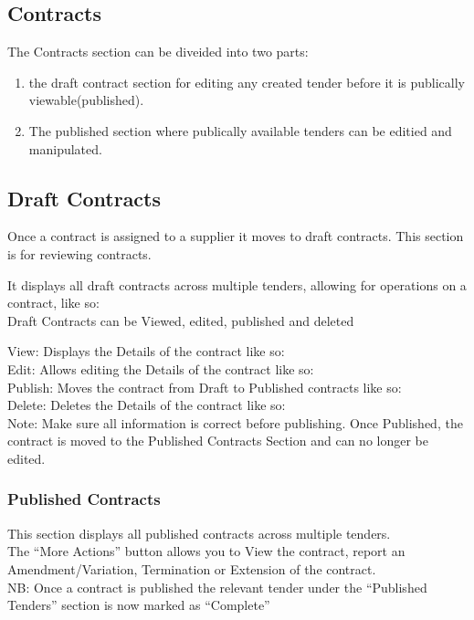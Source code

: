 \documentclass [12pt]{book}
\begin{document}
\begin{enumerate}
\begin{enumerate}
    


\subsection{Contracts}
The Contracts section can be  diveided into two parts: 
\begin{enumerate}
    \item the draft contract section for editing any created tender before it is publically viewable(published).
    \item The published section where publically available tenders can be editied and manipulated.
\end{enumerate}


\subsection{Draft Contracts}
Once a contract is assigned to a supplier it moves to draft contracts. This section is for reviewing contracts.

It displays all draft contracts across multiple tenders, allowing for operations on a contract, like so:\\
[Images]

Draft Contracts can be Viewed, edited, published and deleted

View:
Displays the Details of the contract like so:\\


Edit:
Allows editing the Details of the contract like so:\\


Publish:
Moves the contract from Draft to Published contracts like so:\\


Delete:
Deletes the Details of the contract like so:\\


Note: Make sure all information is correct before publishing. Once Published, the contract is moved to the Published Contracts Section and can no longer be edited.
 
\subsubsection{Published Contracts}
This section displays all published contracts across multiple tenders.\\
The “More Actions” button allows you to View the contract, report an Amendment/Variation, Termination or Extension of the contract.\\
NB: Once a contract is published the relevant tender under the “Published Tenders” section is now marked as “Complete”


\end{enumerate}
\end{enumerate}
\end{document}
